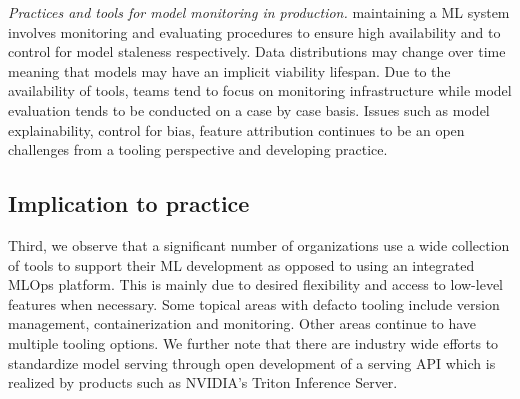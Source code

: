 \textit{Practices and tools for model monitoring in production.} maintaining a ML system involves monitoring and evaluating procedures to ensure high availability and to control for model staleness respectively. Data distributions may change over time meaning that models may have an implicit viability lifespan. Due to the availability of tools, teams tend to focus on monitoring infrastructure while model evaluation tends to be conducted on a case by case basis. Issues such as model explainability, control for bias, feature attribution continues to be an open challenges from a tooling perspective and developing practice.

\subsection{Implication to practice}
Third, we observe that a significant number of organizations use a wide collection of tools to support their ML development as opposed to using an integrated MLOps platform. This is mainly due to desired flexibility and access to low-level features when necessary. Some topical areas with defacto tooling include version management, containerization and monitoring. Other areas continue to have multiple tooling options. We further note that there are industry wide efforts to standardize model serving through open development of a serving API which is realized by products such as NVIDIA's Triton Inference Server.


 
